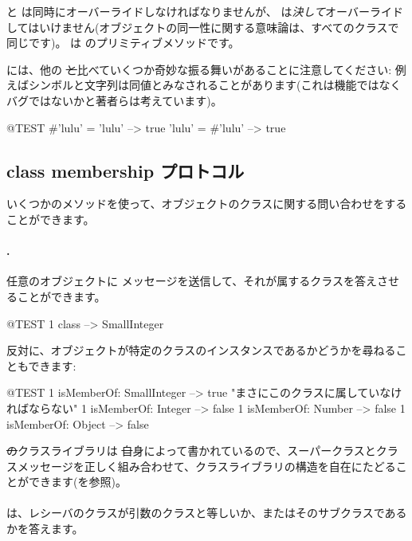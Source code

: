 \documentclass[a4paper,10pt,twoside]{book}
\begin{document}
\ct{=} と  は同時にオーバーライドしなければなりませんが、\ct{==} は\emph{決して}オーバーライドしてはいけません(オブジェクトの同一性に関する意味論は、すべてのクラスで同じです)。\ct{==} は  のプリミティブメソッドです。%

\pharo には、他の \st と比べていくつか奇妙な振る舞いがあることに注意してください: 例えばシンボルと文字列は同値とみなされることがあります(これは機能ではなくバグではないかと著者らは考えています)。

\begin{code}{@TEST}
#'lulu' = 'lulu' --> true
'lulu' = #'lulu' --> true
\end{code}


\subsection{class membership プロトコル}
いくつかのメソッドを使って、オブジェクトのクラスに関する問い合わせをすることができます。

\paragraph{.} 任意のオブジェクトに  メッセージを送信して、それが属するクラスを答えさせることができます。
\begin{code}{@TEST}
1 class --> SmallInteger
\end{code}

反対に、オブジェクトが特定のクラスのインスタンスであるかどうかを尋ねることもできます:
\begin{code}{@TEST}
1 isMemberOf: SmallInteger --> true    "まさにこのクラスに属していなければならない"
1 isMemberOf: Integer          --> false
1 isMemberOf: Number        --> false
1 isMemberOf: Object           --> false
\end{code}

\st のクラスライブラリは \st 自身によって書かれているので、スーパークラスとクラスメッセージを正しく組み合わせて、クラスライブラリの構造を自在にたどることができます(を参照)。

\paragraph{}
 は、レシーバのクラスが引数のクラスと等しいか、またはそのサブクラスであるかを答えます。
\end{document}
